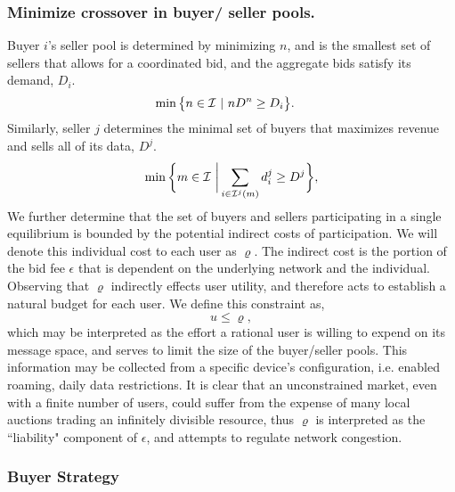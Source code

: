 \subsubsection{Minimize crossover in buyer/ seller pools.}
Buyer $i$'s seller pool is determined by minimizing $n$, and is the smallest set of sellers that
allows for a coordinated bid, and the aggregate bids satisfy its demand, $D_i$.
\begin{align}
\begin{split}\label{buyercoordinate}
    \min\big\lbrace n \in \mathcal{I} \ &\vert \ n D^n\ge D_i \big\rbrace. 
\end{split}
\end{align}
Similarly, seller $j$ determines the minimal set of buyers that maximizes revenue and
sells all of its data, $D^j$.
\begin{equation}\label{sellercoordinate}
    \min\bigg\lbrace m \in\mcI \ \bigg\vert\displaystyle\sum_{i\in\mcI^j(m)}d_i^j
\ge D^j \bigg\rbrace,
\end{equation} 
We further determine that the set of buyers and sellers participating
in a single equilibrium is bounded by the potential indirect costs of
participation. We will denote this individual cost to each user as
$\varrho$. The indirect cost is the portion of the bid fee
$\epsilon$ that is dependent on the underlying network and the individual.
Observing that $\varrho$ indirectly effects user utility,
and therefore acts to establish a natural budget for each user. We define this
constraint as, 
\begin{equation}\label{poolbnd}
    u \le \varrho,
\end{equation}
which may be interpreted as the effort a rational user is willing to expend
on its message space, and serves to limit the size of the buyer/seller pools. 
This information may be collected from a specific
device's configuration, i.e. enabled roaming, daily data restrictions.
It is clear that an unconstrained
market, even with a finite number of users, could suffer from the
expense of many local auctions trading an infinitely divisible resource, thus
$\varrho$ is interpreted as
the ``liability" component of $\epsilon$, and attempts to regulate network congestion. 

\subsubsection{Buyer Strategy}
 
